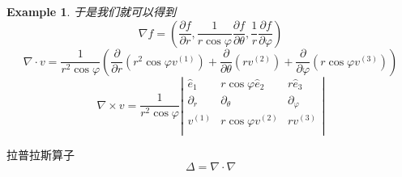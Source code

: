 \documentclass[11pt,hyperref,a4paper,UTF8]{ctexart}
\newtheorem{example}{Example}[subsection]
\newcommand{\parameter}[1]{\left(#1\right)}
\begin{document}
\begin{CJK}{UTF8}{gkai}
\begin{example}
  于是我们就可以得到
  \[\nabla f = \parameter{\frac{\partial f}{\partial r},\frac{1}{r \cos \varphi} \frac{\partial f}{\partial \theta},\frac{1}{r} \frac{\partial f}{\partial \varphi}}\]
  \[\nabla \cdot v = \frac{1}{r^2 \cos \varphi} \parameter{\frac{\partial}{\partial r} (r^2 \cos \varphi v^{(1)}) + \frac{\partial}{\partial \theta} (r v^{(2)}) + \frac{\partial}{\partial \varphi} (r \cos \varphi v^{(3)})}\]
  \[\nabla \times v = \frac{1}{r^2 \cos \varphi}\left|\begin{matrix}
    \hat{e}_1 & r\cos \varphi \hat{e}_2 & r \hat{e}_3\\
    \partial_r & \partial_\theta & \partial_\varphi\\
    v^{(1)} & r \cos \varphi v^{(2)} & r v^{(3)}\\
  \end{matrix}\right|\]
\end{example}


拉普拉斯算子
\[\Delta = \nabla \cdot \nabla\]
\end{CJK}
\end{document}
